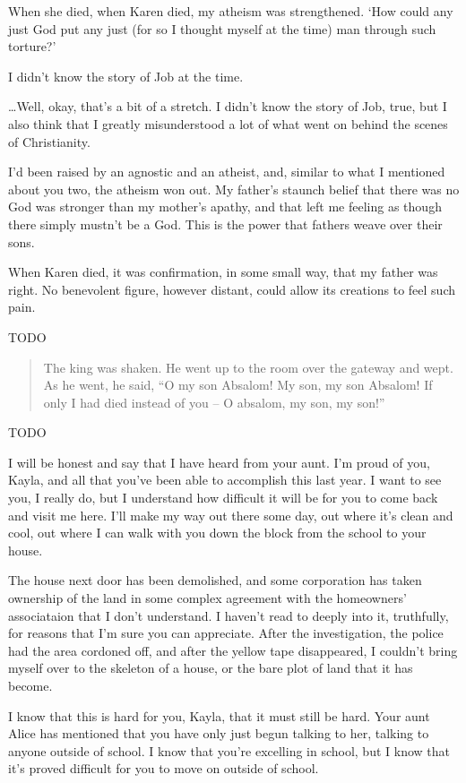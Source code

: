 \begin{itshape}
When she died, when Karen died, my atheism was strengthened.  `How could any just God put any just (for so I thought myself at the time) man through such torture?'

I didn't know the story of Job at the time.

\ldots{}Well, okay, that's a bit of a stretch.  I didn't know the story of Job, true, but I also think that I greatly misunderstood a lot of what went on behind the scenes of Christianity.

I'd been raised by an agnostic and an atheist, and, similar to what I mentioned about you two, the atheism won out.  My father's staunch belief that there was no God was stronger than my mother's apathy, and that left me feeling as though there simply mustn't be a God.  This is the power that fathers weave over their sons.

When Karen died, it was confirmation, in some small way, that my father was right.  No benevolent figure, however distant, could allow its creations to feel such pain.

TODO%

\begin{quote}
  The king was shaken.  He went up to the room over the gateway and wept.  As he went, he said, ``O my son Absalom! My son, my son Absalom! If only I had died instead of you -- O absalom, my son, my son!''
\end{quote}

TODO%

I will be honest and say that I have heard from your aunt.  I'm proud of you, Kayla, and all that you've been able to accomplish this last year.  I want to see you, I really do, but I understand how difficult it will be for you to come back and visit me here.  I'll make my way out there some day, out where it's clean and cool, out where I can walk with you down the block from the school to your house.

The house next door has been demolished, and some corporation has taken ownership of the land in some complex agreement with the homeowners' associataion that I don't understand.  I haven't read to deeply into it, truthfully, for reasons that I'm sure you can appreciate.  After the investigation, the police had the area cordoned off, and after the yellow tape disappeared, I couldn't bring myself over to the skeleton of a house, or the bare plot of land that it has become.

I know that this is hard for you, Kayla, that it must still be hard.  Your aunt Alice has mentioned that you have only just begun talking to her, talking to anyone outside of school.  I know that you're excelling in school, but I know that it's proved difficult for you to move on outside of school.


\end{itshape}
